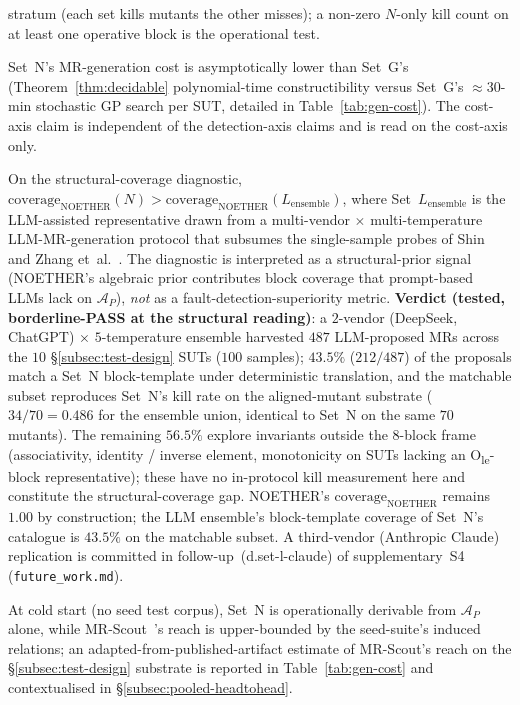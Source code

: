 \documentclass[manuscript]{acmart}
\begin{document}
\begin{description}
\begin{description}
      stratum (each set kills mutants the other misses); a
      non-zero $N$-only kill count on at least one operative block
      is the operational test.
    \item[H3a.3 (Cost-axis).] Set~N's MR-generation cost is
      asymptotically lower than Set~G's
      (Theorem~\ref{thm:decidable} polynomial-time constructibility
      versus Set~G's $\approx 30$-min stochastic GP search per SUT,
      detailed in Table~\ref{tab:gen-cost}). The cost-axis claim is
      independent of the detection-axis claims and is read on the
      cost-axis only.
  \end{description}
  \item[Pre-registered hypothesis (H3b, vs LLM-assisted baseline).] On the structural-coverage diagnostic, $\mathrm{coverage}_{\mathrm{NOETHER}}(N) > \mathrm{coverage}_{\mathrm{NOETHER}}(L_{\mathrm{ensemble}})$, where Set~$L_{\mathrm{ensemble}}$ is the LLM-assisted representative drawn from a multi-vendor $\times$ multi-temperature LLM-MR-generation protocol that subsumes the single-sample probes of Shin~\cite{Shin2024} and Zhang et~al.~\cite{ZhangChatGPTMR2023}. The diagnostic is interpreted as a structural-prior signal (NOETHER's algebraic prior contributes block coverage that prompt-based LLMs lack on $\mathcal{A}_P$), \emph{not} as a fault-detection-superiority metric. \textbf{Verdict (tested, borderline-PASS at the structural reading)}: a $2$-vendor (DeepSeek, ChatGPT) $\times$ $5$-temperature ensemble harvested $487$ LLM-proposed MRs across the $10$ \S\ref{subsec:test-design} SUTs ($100$ samples); $43.5\%$ ($212/487$) of the proposals match a Set~N block-template under deterministic translation, and the matchable subset reproduces Set~N's kill rate on the aligned-mutant substrate ($34/70 = 0.486$ for the ensemble union, identical to Set~N on the same $70$ mutants). The remaining $56.5\%$ explore invariants outside the $8$-block frame (associativity, identity / inverse element, monotonicity on SUTs lacking an O\textsubscript{le}-block representative); these have no in-protocol kill measurement here and constitute the structural-coverage gap. NOETHER's $\mathrm{coverage}_{\mathrm{NOETHER}}$ remains $1.00$ by construction; the LLM ensemble's block-template coverage of Set~N's catalogue is $43.5\%$ on the matchable subset. A third-vendor (Anthropic Claude) replication is committed in follow-up~(d.set-l-claude) of supplementary~S4 (\texttt{future\_work.md}).
  \item[Pre-registered hypothesis (H3c, vs mining-based baseline).] At cold start (no seed test corpus), Set~N is operationally derivable from $\mathcal{A}_P$ alone, while MR-Scout~\cite{MRScout2024}'s reach is upper-bounded by the seed-suite's induced relations; an adapted-from-published-artifact estimate of MR-Scout's reach on the §\ref{subsec:test-design} substrate is reported in Table~\ref{tab:gen-cost} and contextualised in \S\ref{subsec:pooled-headtohead}.

\end{description}
\end{document}

